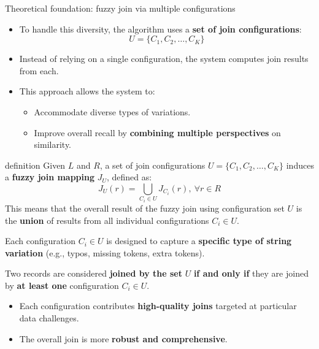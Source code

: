 \documentclass[8pt]{beamer} %
\begin{document}
\begin{frame}{Theoretical foundation: fuzzy join via multiple configurations}
	
	\begin{itemize}
		\item To handle this diversity, the algorithm uses a \textbf{set of join configurations}:
		$$
		U = \{C_1, C_2, \dots, C_K\}
		$$
		\item Instead of relying on a single configuration, the system computes join results from each.
		\item This approach allows the system to:
		\begin{itemize}
			\item Accommodate diverse types of variations.
			\item Improve overall recall by \textbf{combining multiple perspectives} on similarity.
		\end{itemize}
	\end{itemize}
	
	\vspace{1em}

	\begin{beamercolorbox}[rounded=true, shadow=true, leftskip=1em, rightskip=1em]{definition}
		Given $L$ and $R$, a set of join configurations $U = \{C_1, C_2, \ldots, C_K\}$ induces a \textbf{fuzzy join mapping} $J_U$, defined as:
		$$
		J_U(r) = \bigcup_{C_i \in U} J_{C_i}(r),\ \forall r \in R
		$$
		This means that the overall result of the fuzzy join using configuration set $U$ is the \textbf{union} of results from all individual configurations $C_i \in U$.
	\end{beamercolorbox}
	
	\vspace{0.5em}
	
	Each configuration $C_i \in U$ is designed to capture a \textbf{specific type of string variation} (e.g., typos, missing tokens, extra tokens).
	
	Two records are considered \textbf{joined by the set} $U$ \textbf{if and only if} they are joined by \textbf{at least one} configuration $C_i \in U$.
	
	\begin{itemize}
		\item Each configuration contributes \textbf{high-quality joins} targeted at particular data challenges.
		\item The overall join is more \textbf{robust and comprehensive}.
	\end{itemize}
\end{frame}
\end{document}
